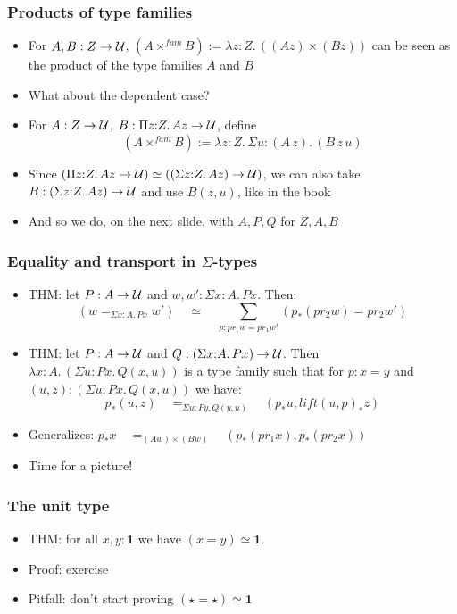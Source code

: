\documentclass[handout]{beamer}
\newcommand{\depi}[3]{\Pi{#1{:}#2.\,#3}}
\newcommand{\sigm}[3]{\Sigma{#1{:}#2.\,#3}}
\newcommand{\lamt}[3]{\lambda{#1{:}#2.\,#3}}
\newcommand{\UU}{{\cal U}}
\newcommand{\bfone}{\mathbf{1}}
\begin{document}
\frame
  {

    \frametitle{Products of type families}

    \begin{itemize}[<+->]
    \item For $A,B:Z\to\UU$,  $(A\times^{fam}B)  := \lamt{z}{Z}{((A z)\times(B z))}$
               can be seen as the product of the type families $A$ and $B$
    \item What about the dependent case?
    \item For $A: Z\to\UU$, $B: \depi{z}{Z}{Az \to\UU}$,  define
                \[(A\times^{fam}B)  := \lamt{z}{Z}{\sigm{u}{(A\,z)}{(B\,z\,u)}}\]
    \item Since $(\depi{z}{Z}{Az \to\UU}) \simeq ((\sigm{z}{Z}{Az}) \to\UU)$,
               we can also take $B: (\sigm{z}{Z}{Az}) \to\UU$ and use $B(z,u)$,
              like in the book
    \item And so we do, on the next slide, with $A,P,Q$ for $Z,A,B$
 
    \end{itemize}
  }

 \frame
  {

    \frametitle{Equality and transport in $\Sigma$-types}

    \begin{itemize}[<+->]
    \item THM: let $P:A\to\UU$ and $w,w':\sigm{x}{A}{Px}$. Then:
    $$(w=_{\sigm{x}{A}{Px}} w') \quad\simeq\quad\sum_{p:pr_1 w = pr_1 w'}(p_*(pr_2 w) = pr_2 w')$$
    \item THM: let $P:A\to\UU$ and $Q:(\sigm{x}{A}{Px})\to\UU$. 
    Then $\lamt{x}{A}{(\sigm{u}{Px}{Q(x,u)})}$ is a type family such that for
    $p:x=y$ and $(u,z):(\sigm{u}{Px}{Q(x,u)})$ we have:
    $$p_*(u,z)\quad=_{\sigm{u}{Py}{Q(y,u)}}\quad(p_*u,lift(u,p)_* z)$$
    \item Generalizes: $p_* x \quad =_{(A w)\times (B w)}\quad (p_* (pr_1 x), p_* (pr_2 x))$
    \item Time for a picture!
    \end{itemize}
  }


\frame
  {

    \frametitle{The unit type}

    \begin{itemize}[<+->]
    \item THM: for all $x,y:\bfone$ we have $(x=y)\simeq\bfone$.
    \item Proof: exercise
    \item Pitfall: don't start proving $(\star=\star)\simeq\bfone$
    \end{itemize}
  }
\end{document}
